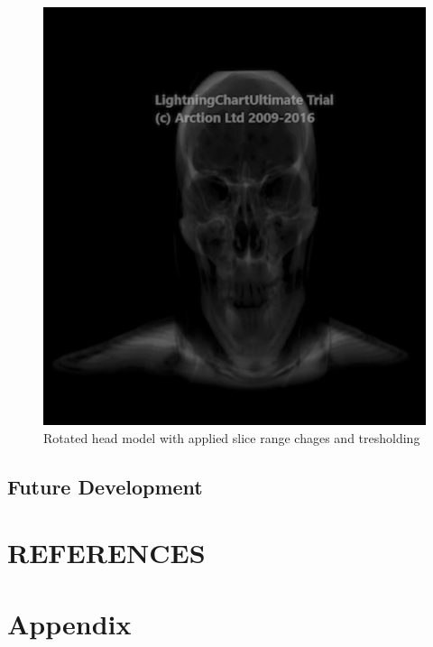 \documentclass[twoside, english, 11pt]{report}
\begin{document}
\begin{figure}[H]
\centerline{\includegraphics[scale = 0.5]{img/semi-sculp}}
\caption{Rotated head model with applied slice range chages and tresholding\label{fig:sculp}}
\end{figure}



\section{Future Development}

\chapter{REFERENCES}

\chapter{Appendix}
\end{document}
